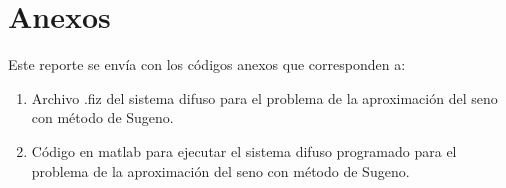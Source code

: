 \documentclass[11pt, letterpaper]{article}
\begin{document}

\newpage

\section{Anexos}

Este reporte se envía con los códigos anexos que corresponden a:

\begin{enumerate}
	\item Archivo .fiz del sistema difuso para el problema de la aproximación del seno con método de Sugeno.
	\item Código en matlab para ejecutar el sistema difuso programado para el problema de la aproximación del seno con método de Sugeno.

\end{enumerate}
\end{document}
